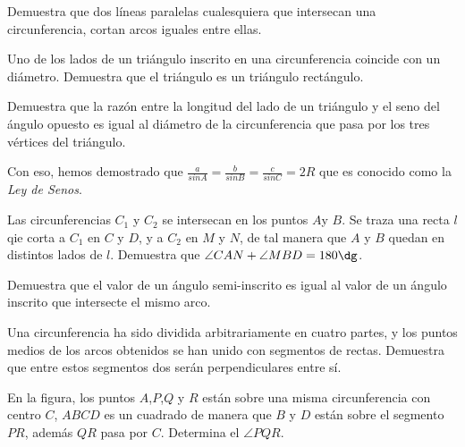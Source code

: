 \begin{dproblem}[$3 \clubsuit$]
    Demuestra que dos líneas paralelas cualesquiera que intersecan
    una circunferencia, cortan arcos iguales entre ellas.
\end{dproblem}

\begin{dproblem}[$3 \clubsuit$]
    Uno de los lados de un triángulo inscrito en una 
    circunferencia coincide con un diámetro. Demuestra que el 
    triángulo es un triángulo rectángulo.
\end{dproblem}

\begin{dproblem}[$6 \clubsuit$]
    Demuestra que la razón entre la longitud del lado de un
    triángulo y el seno del ángulo opuesto es igual al diámetro 
    de la circunferencia que pasa por los tres vértices del triángulo.
\end{dproblem}

\begin{remark}
    Con eso, hemos demostrado que $\frac{a}{sin A} = 
    \frac{b}{sin B} = \frac{c}{sin C} = 2R$ que es conocido 
    como la \textit{Ley de Senos}.
\end{remark}

\begin{problem}[$4 \clubsuit$]
    Las circunferencias $C_1$ y $C_2$ se intersecan en los puntos 
    $A$y $B$. Se traza una recta $l$ qie corta a $C_1$ en 
    $C$ y $D$, y a $C_2$ en $M$ y $N$, de tal manera que $A$ y 
    $B$ quedan en distintos lados de $l$. Demuestra que $\angle 
    CAN + \angle MBD = 180 \dg$.
\end{problem}

\begin{problem}[$5 \clubsuit$]
    Demuestra que el valor de un ángulo semi-inscrito es igual 
    al valor de un ángulo inscrito que intersecte el mismo arco.
\end{problem}

\begin{problem}[$5 \clubsuit$]
    Una circunferencia ha sido dividida arbitrariamente en 
    cuatro partes, y los puntos medios de los arcos obtenidos se 
    han unido con segmentos de rectas. Demuestra que entre estos 
    segmentos dos serán perpendiculares entre sí.
\end{problem}

\begin{problem}
    En la figura, los puntos $A$,$P$,$Q$ y $R$ están sobre una 
    misma circunferencia con centro $C$, $ABCD$ es un cuadrado 
    de manera que $B$ y $D$ están sobre el segmento $PR$, además 
    $QR$ pasa por $C$. Determina el $\angle PQR$.
\end{problem}

